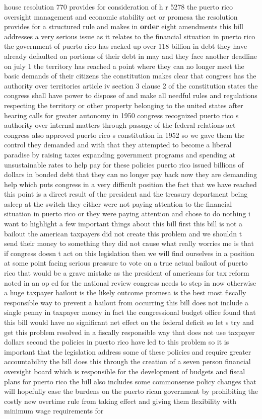 \documentclass{article}
\begin{document}
house resolution 770 provides for consideration of h r 5278 the puerto rico oversight management and economic stability act or promesa the resolution provides for a structured rule and makes in {\bf \color{red} order} eight amendments this bill addresses a very serious issue as it relates to the financial situation in puerto rico the government of puerto rico has racked up over 118 billion in debt they have already defaulted on portions of their debt in may and they face another deadline on july 1 the territory has reached a point where they can no longer meet the basic demands of their citizens the constitution makes clear that congress has the authority over territories article iv section 3 clause 2 of the constitution states the congress shall have power to dispose of and make all needful rules and regulations respecting the territory or other property belonging to the united states after hearing calls for greater autonomy in 1950 congress recognized puerto rico s authority over internal matters through passage of the federal relations act congress also approved puerto rico s constitution in 1952 so we gave them the control they demanded and with that they attempted to become a liberal paradise by raising taxes expanding government programs and spending at unsustainable rates to help pay for these policies puerto rico issued billions of dollars in bonded debt that they can no longer pay back now they are demanding help which puts congress in a very difficult position the fact that we have reached this point is a direct result of the president and the treasury department being asleep at the switch they either were not paying attention to the financial situation in puerto rico or they were paying attention and chose to do nothing i want to highlight a few important things about this bill first this bill is not a bailout the american taxpayers did not create this problem and we shouldn t send their money to something they did not cause what really worries me is that if congress doesn t act on this legislation then we will find ourselves in a position at some point facing serious pressure to vote on a true actual bailout of puerto rico that would be a grave mistake as the president of americans for tax reform noted in an op ed for the national review congress needs to step in now otherwise a huge taxpayer bailout is the likely outcome promesa is the best most fiscally responsible way to prevent a bailout from occurring this bill does not include a single penny in taxpayer money in fact the congressional budget office found that this bill would have no significant net effect on the federal deficit so let s try and get this problem resolved in a fiscally responsible way that does not use taxpayer dollars second the policies in puerto rico have led to this problem so it is important that the legislation address some of these policies and require greater accountability the bill does this through the creation of a seven person financial oversight board which is responsible for the development of budgets and fiscal plans for puerto rico the bill also includes some commonsense policy changes that will hopefully ease the burdens on the puerto rican government by prohibiting the costly new overtime rule from taking effect and giving them flexibility with minimum wage requirements for 
\end{document}
